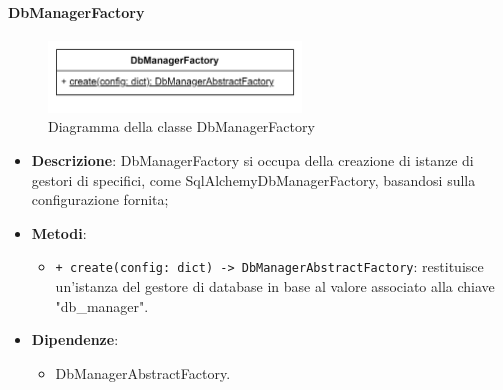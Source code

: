 \paragraph{DbManagerFactory} \label{DbManagerFactory}
\begin{figure}[H]
    \centering
    \includegraphics[width=0.6\textwidth]{assets/Backend/db_manager_factory.png}
    \caption{Diagramma della classe DbManagerFactory}
  \end{figure}
\begin{itemize}
    \item \textbf{Descrizione}: DbManagerFactory si occupa della creazione di istanze di gestori di  specifici, come SqlAlchemyDbManagerFactory, basandosi sulla configurazione fornita;
    \item \textbf{Metodi}:
    \begin{itemize}
        \item \texttt{+ create(config: dict) -> DbManagerAbstractFactory}: restituisce un'istanza del gestore di database in base al valore associato alla chiave "db_manager".
    \end{itemize}
    \item \textbf{Dipendenze}:
    \begin{itemize}
        \item DbManagerAbstractFactory.
    \end{itemize}
\end{itemize}

